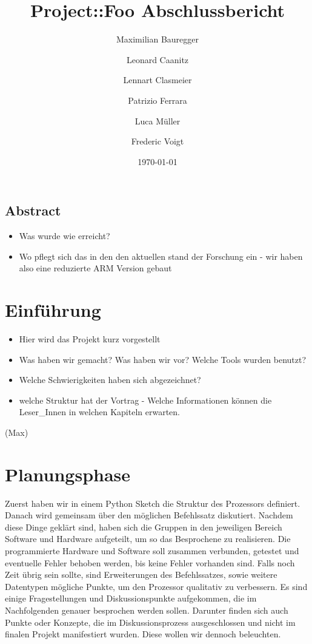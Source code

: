 \documentclass[paper=a4,fontsize=12pt,twocolumn]{scrreprt}
\title{Project::Foo Abschlussbericht}
\author{Maximilian Bauregger \and Leonard Caanitz \and Lennart Clasmeier \and Patrizio Ferrara \and Luca Müller \and Frederic Voigt}
\date{\today}
\begin{document}
\maketitle

\tableofcontents

\section*{Abstract}

\begin{itemize}
    \item Was wurde wie erreicht?
    \item Wo pflegt sich das in den den aktuellen stand der Forschung ein - wir haben also eine reduzierte ARM Version gebaut
\end{itemize}
\kant[1]


\chapter{Einführung}
\begin{itemize}
    \item Hier wird das Projekt kurz vorgestellt
    \item Was haben wir gemacht? Was haben wir vor? Welche Tools wurden benutzt?
    \item Welche Schwierigkeiten haben sich abgezeichnet?
    \item welche Struktur hat der Vortrag - Welche Informationen können die Leser\_Innen in welchen Kapiteln erwarten.
\end{itemize}
\kant[2-3]

(Max)

\chapter{Planungsphase}
Zuerst haben wir in einem Python Sketch die Struktur des Prozessors definiert.
Danach wird gemeinsam über den möglichen Befehlssatz diskutiert.
Nachdem diese Dinge geklärt sind, haben sich die Gruppen in den jeweiligen Bereich Software und Hardware aufgeteilt, um so das Besprochene zu realisieren.
Die programmierte Hardware und Software soll zusammen verbunden, getestet und eventuelle Fehler behoben werden, bis keine Fehler vorhanden sind.
Falls noch Zeit übrig sein sollte, sind Erweiterungen des Befehlssatzes, sowie weitere Datentypen mögliche Punkte, um den Prozessor qualitativ zu verbessern.
Es sind einige Fragestellungen und Diskussionspunkte aufgekommen, die im Nachfolgenden genauer besprochen werden sollen.
Darunter finden sich auch Punkte oder Konzepte, die im Diskussionsprozess ausgeschlossen und nicht im finalen Projekt manifestiert wurden.
Diese wollen wir dennoch beleuchten.
\end{document}
